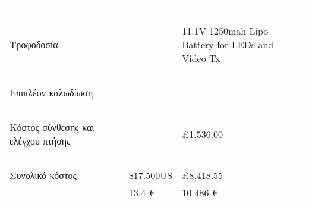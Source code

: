 \documentclass[a4paper, 12pt, twoside]{report}
\begin{document}
\begin{landscape}
\begin{longtable}{ m{3cm} m{2.2cm} m{2.2cm} m{2.2cm} m{2.2cm} }
				\hdashline
				~\\
				Τροφοδοσία & & & & 11.1V 1250mah Lipo Battery for LEDs and Video Tx\\ 
				~\\
				Επιπλέον καλωδίωση & & & & \\
				\hdashline
				~\\
				Κόστος σύνθεσης και ελέγχου πτήσης & & & & £1,536.00\\
				\hline
				~\\
				Συνολικό κόστος & & & \$17.500US & £8,418.55\\
				& & & 13.4 \euro & 10 486 \euro\\
				\hline
		\end{longtable}
		\end{landscape}
	

	\cleardoublepage
	\label{κεφ.:Βιβλιογραφία}
	\printbibliography[title={Βιβλιογραφία}]
	
\end{document}
